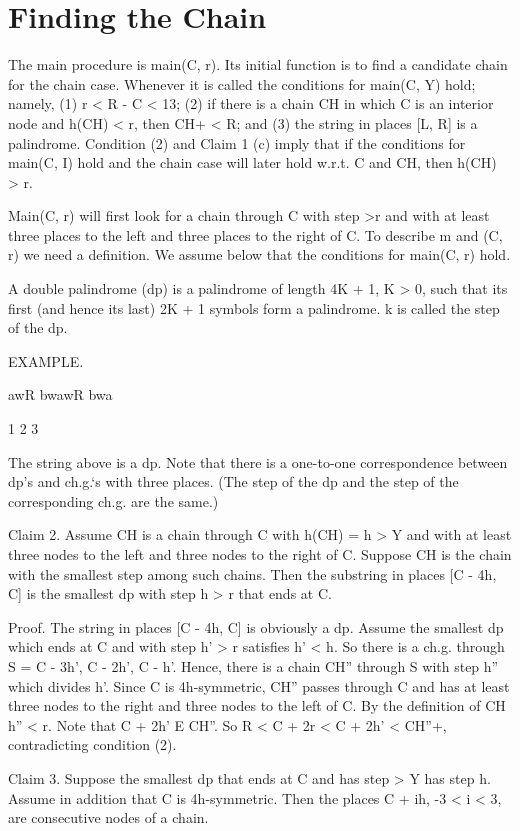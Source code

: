 \documentclass[11pt,a4paper]{report}
\begin{document}
\chapter{Finding the Chain}

The main procedure is main(C, r). Its initial function is to find a candidate chain for
the chain case. Whenever it is called the conditions for main(C, Y) hold; namely, (1) r <
R - C < 13; (2) if there is a chain CH in which C is an interior node and h(CH) < r,
then CH+ < R; and (3) the string in places [L, R] is a palindrome. Condition (2) and
Claim 1 (c) imply that if the conditions for main(C, I) hold and the chain case will later
hold w.r.t. C and CH, then h(CH) > r.

Main(C, r) will first look for a chain through C with step >r and with at least three
places to the left and three places to the right of C. To describe m and (C, r) we need a
definition. We assume below that the conditions for main(C, r) hold.

A double palindrome (dp) is a palindrome of length 4K + 1, K > 0, such that its first
(and hence its last) 2K + 1 symbols form a palindrome. k is called the step of the dp.

EXAMPLE.

awR bwawR bwa

1 2 3

The string above is a dp. Note that there is a one-to-one correspondence between dp’s
and ch.g.‘s with three places. (The step of the dp and the step of the corresponding ch.g.
are the same.)

Claim 2. Assume CH is a chain through C with h(CH) = h > Y and with at least
three nodes to the left and three nodes to the right of C. Suppose CH is the chain with 
the smallest step among such chains. Then the substring in places [C - 4h, C] is the smallest
dp with step h > r that ends at C.

Proof. The string in places [C - 4h, C] is obviously a dp. Assume the smallest dp
which ends at C and with step h’ > r satisfies h’ < h. So there is a ch.g. through S =
{C - 3h’, C - 2h’, C - h’}. Hence, there is a chain CH” through S with step h” which
divides h’. Since C is 4h-symmetric, CH” passes through C and has at least three nodes
to the right and three nodes to the left of C. By the definition of CH h” < r. Note that
C + 2h’ E CH”. So R < C + 2r < C + 2h’ < CH”+, contradicting condition (2). 

Claim 3. Suppose the smallest dp that ends at C and has step > Y has step h. Assume
in addition that C is 4h-symmetric. Then the places C + ih, -3 < i < 3, are consecutive
nodes of a chain.
\end{document}
